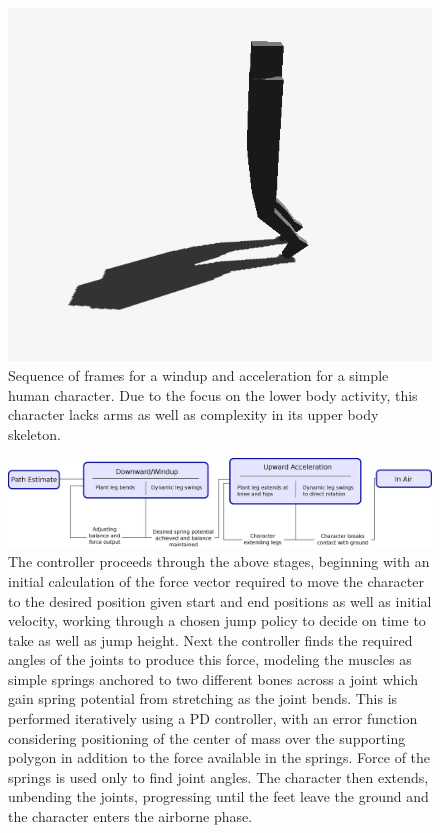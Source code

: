 \documentclass[landscape,26pt]{sciposter}
\begin{document}
\begin{minipage}[t]{17in}
\begin{figure}
            \includegraphics[width=0.2\columnwidth]{jump_sequence/jump8Cropped.png}
			\caption{Sequence of frames for a windup and acceleration for a simple human character.  Due to the focus on the lower body activity, this character lacks arms as well as complexity in its upper body skeleton.}
		\end{figure}

        \begin{figure}
            \centering
            \includegraphics[width=0.8\columnwidth]{diagrams/system_diag_horiz.eps}
            \caption{The controller proceeds through the above stages, beginning with an initial calculation of the force vector required to move the character to the desired position given start and end positions as well as initial velocity, working through a chosen jump policy to decide on time to take as well as jump height.  Next the controller finds the required angles of the joints to produce this force, modeling the muscles as simple springs anchored to two different bones across a joint which gain spring potential from stretching as the joint bends.  This is performed iteratively using a PD controller, with an error function considering positioning of the center of mass over the supporting polygon in addition to the force available in the springs.  Force of the springs is used only to find joint angles.  The character then extends, unbending the joints, progressing until the feet leave the ground and the character enters the airborne phase.}
        \end{figure}


\end{minipage}
\end{document}

